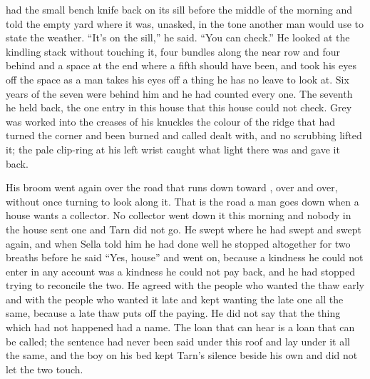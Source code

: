 \scenebreak

 had the small bench knife back on its sill before the middle of the morning and told the empty yard where it was, unasked, in the tone another man would use to state the weather. “It's on the sill,” he said. “You can check.” He looked at the kindling stack without touching it, four bundles along the near row and four behind and a space at the end where a fifth should have been, and took his eyes off the space as a man takes his eyes off a thing he has no leave to look at. Six years of the seven were behind him and he had counted every one. The seventh he held back, the one entry in this house that this house could not check. Grey  was worked into the creases of his knuckles the colour of the ridge that had turned the corner and been burned and called dealt with, and no scrubbing lifted it; the pale clip-ring at his left wrist caught what light there was and gave it back.

His broom went again over the road that runs down toward , over and over, without once turning to look along it. That is the road a man goes down when a house wants a collector. No collector went down it this morning and nobody in the house sent one and Tarn did not go. He swept where he had swept and swept again, and when Sella told him he had done well he stopped altogether for two breaths before he said “Yes, house” and went on, because a kindness he could not enter in any account was a kindness he could not pay back, and he had stopped trying to reconcile the two. He agreed with the people who wanted the thaw early and with the people who wanted it late and kept wanting the late one all the same, because a late thaw puts off the paying. He did not say that the thing which had not happened had a name. The loan that can hear is a loan that can be called; the sentence had never been said under this roof and lay under it all the same, and the boy on his bed kept Tarn's silence beside his own and did not let the two touch.

\scenebreak

